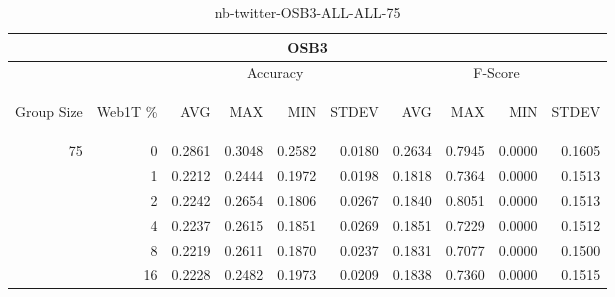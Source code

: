 \begin{center}
\begin{table}[htbp]
\begin{center}
\begin{tabular}{ | r | r | r | r | r | r | r | r | r | r |}
\hline
\multicolumn{10}{|c|}{OSB3}\\
\hline
 & & \multicolumn{4}{|c|}{Accuracy} & \multicolumn{4}{|c|}{F-Score}\\ \cline{3-10}
\begin{sideways}Group Size\end{sideways} & \begin{sideways}Web1T \%\end{sideways} & \begin{sideways}AVG\end{sideways} & \begin{sideways}MAX\end{sideways} & \begin{sideways}MIN\end{sideways} & \begin{sideways}STDEV\end{sideways} & \begin{sideways}AVG\end{sideways} & \begin{sideways}MAX\end{sideways} & \begin{sideways}MIN\end{sideways} & \begin{sideways}STDEV\end{sideways}\\
\hline
\multirow{5}{*}{75}
 & 0 & 0.2861 & 0.3048 & 0.2582 & 0.0180 & 0.2634 & 0.7945 & 0.0000 & 0.1605\\ \cline{2-10}
 & 1 & 0.2212 & 0.2444 & 0.1972 & 0.0198 & 0.1818 & 0.7364 & 0.0000 & 0.1513\\ \cline{2-10}
 & 2 & 0.2242 & 0.2654 & 0.1806 & 0.0267 & 0.1840 & 0.8051 & 0.0000 & 0.1513\\ \cline{2-10}
 & 4 & 0.2237 & 0.2615 & 0.1851 & 0.0269 & 0.1851 & 0.7229 & 0.0000 & 0.1512\\ \cline{2-10}
 & 8 & 0.2219 & 0.2611 & 0.1870 & 0.0237 & 0.1831 & 0.7077 & 0.0000 & 0.1500\\ \cline{2-10}
 & 16 & 0.2228 & 0.2482 & 0.1973 & 0.0209 & 0.1838 & 0.7360 & 0.0000 & 0.1515\\ \cline{2-10}
\hline
\end{tabular}
\caption{nb-twitter-OSB3-ALL-ALL-75}
\label{table:nb-twitter-OSB3-ALL-ALL-75}
\end{center}
\end{table}
\end{center}

